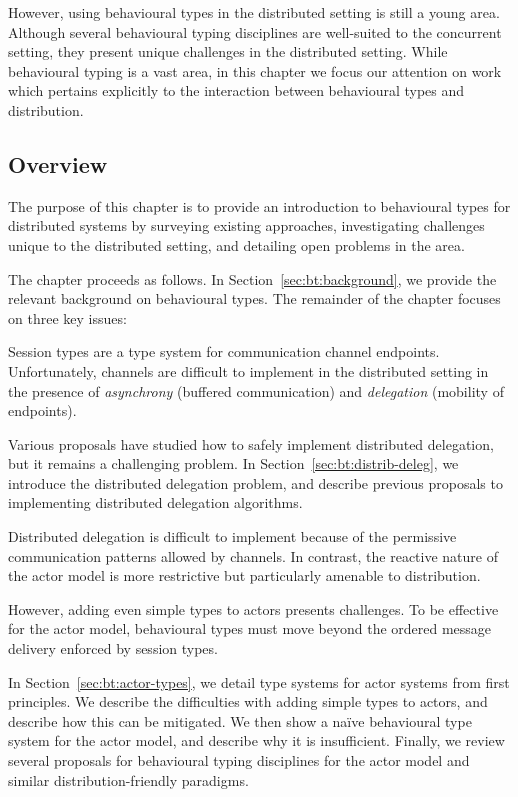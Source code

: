 \documentclass[
graybox,
envcountchap
]{svmult}
\begin{document}
\begin{bibunit}
  However, using behavioural types in the distributed setting is still a young
  area. Although several behavioural typing disciplines are well-suited to the
  concurrent setting, they present unique challenges in the distributed setting.
  While behavioural typing is a vast area, in this chapter we focus our
  attention on work which pertains explicitly to the interaction between
  behavioural types and distribution.

  \subsection{Overview}

  The purpose of this chapter is to provide an introduction to behavioural types
  for distributed systems by surveying existing approaches, investigating
  challenges unique to the distributed setting, and detailing open problems in
  the area.

  The chapter proceeds as follows.  In Section~\ref{sec:bt:background}, we
  provide the relevant background on behavioural types.
  The remainder of the chapter focuses on three key issues:

      Session types are a type system for communication channel endpoints.
      Unfortunately, channels are difficult to implement in the distributed
      setting in the presence of \emph{asynchrony} (buffered communication) and
      \emph{delegation} (mobility of endpoints).

      Various proposals have studied how to safely implement distributed
      delegation, but it remains a challenging problem.
      In Section~\ref{sec:bt:distrib-deleg}, we introduce the distributed delegation
      problem, and describe previous proposals to implementing distributed
      delegation algorithms.

      Distributed delegation is difficult to implement because of the permissive
      communication patterns allowed by channels. In contrast, the reactive
      nature of the actor model is more restrictive but particularly amenable
      to distribution.

      However, adding even simple types to actors presents challenges.
      To be effective for the actor model, behavioural types must move beyond
      the ordered message delivery enforced by session types.

      In Section~\ref{sec:bt:actor-types}, we detail type systems for actor
      systems from first principles. We describe the difficulties with adding
      simple types to actors, and describe how this can be mitigated. We then
      show a na\"ive behavioural type system for the actor model, and describe
      why it is insufficient. Finally, we review several proposals for behavioural
      typing disciplines for the actor model and similar distribution-friendly
      paradigms.


\end{bibunit}
\end{document}
